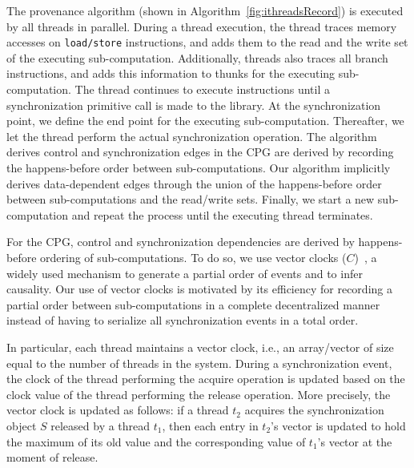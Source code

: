    The provenance algorithm (shown in Algorithm~\ref{fig:ithreadsRecord}) is executed by all threads in parallel. During a thread execution, the thread traces memory accesses on {\tt load/store} instructions, and adds them to the read and
the write set of the executing sub-computation. Additionally, threads also traces all branch instructions, and adds this information to thunks for the executing sub-computation.
The thread continues to execute instructions until a synchronization primitive call is made to the \pthreads  library. At the synchronization point, we define the end point for the executing sub-computation. 
Thereafter, we let the thread perform the actual synchronization operation. The algorithm derives control  and synchronization edges in the CPG are derived by recording the happens-before order between sub-computations. Our algorithm implicitly derives data-dependent edges through the union of the happens-before order between sub-computations and the read/write sets.
Finally, we start a new sub-computation and repeat the process until the executing thread
terminates. 

 


   
   
  



 
 

 For the CPG, control and synchronization dependencies are derived by 
happens-before ordering of sub-computations. To do so, we use vector clocks
($C$)~\cite{Mattern89virtualtime},  a widely used mechanism to generate a partial order of events and to infer causality. Our use of vector
clocks is motivated by its efficiency for recording a partial order between sub-computations in a complete decentralized manner instead of having to serialize all synchronization events in a total order.

In particular, each thread maintains a vector clock, i.e., an array/vector of size equal to the number of threads in the system.  
During a synchronization event, the clock of the thread performing the
acquire operation is updated based on the clock value of the thread performing
the release operation.  More precisely, the vector clock is updated as follows: if a thread $t_2$ acquires the synchronization
object $S$ released by a thread $t_1$, then each entry in $t_2$'s vector is
updated to hold the maximum of its old value and the corresponding value of
$t_1$'s vector at the moment of release.




